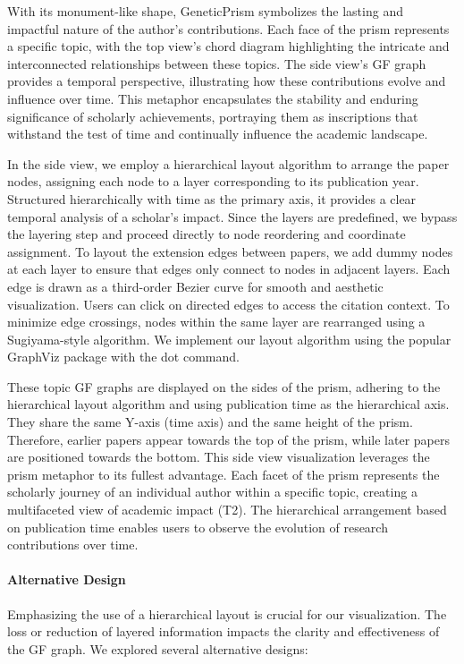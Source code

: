 With its monument-like shape, GeneticPrism symbolizes the lasting and impactful nature of the author's contributions. Each face of the prism represents a specific topic, with the top view's chord diagram highlighting the intricate and interconnected relationships between these topics. The side view's GF graph provides a temporal perspective, illustrating how these contributions evolve and influence over time. This metaphor encapsulates the stability and enduring significance of scholarly achievements, portraying them as inscriptions that withstand the test of time and continually influence the academic landscape.

In the side view, we employ a hierarchical layout algorithm to arrange the paper nodes, assigning each node to a layer corresponding to its publication year. Structured hierarchically with time as the primary axis, it provides a clear temporal analysis of a scholar's impact. Since the layers are predefined, we bypass the layering step and proceed directly to node reordering and coordinate assignment. To layout the extension edges between papers, we add dummy nodes at each layer to ensure that edges only connect to nodes in adjacent layers. Each edge is drawn as a third-order Bezier curve for smooth and aesthetic visualization. Users can click on directed edges to access the citation context. To minimize edge crossings, nodes within the same layer are rearranged using a Sugiyama-style algorithm. We implement our layout algorithm using the popular GraphViz package with the dot command.

These topic GF graphs are displayed on the sides of the prism, adhering to the hierarchical layout algorithm and using publication time as the hierarchical axis. They share the same Y-axis (time axis) and the same height of the prism. Therefore, earlier papers appear towards the top of the prism, while later papers are positioned towards the bottom. This side view visualization leverages the prism metaphor to its fullest advantage. Each facet of the prism represents the scholarly journey of an individual author within a specific topic, creating a multifaceted view of academic impact (T2). The hierarchical arrangement based on publication time enables users to observe the evolution of research contributions over time.

\paragraph{Alternative Design} Emphasizing the use of a hierarchical layout is crucial for our visualization. The loss or reduction of layered information impacts the clarity and effectiveness of the GF graph. We explored several alternative designs:

